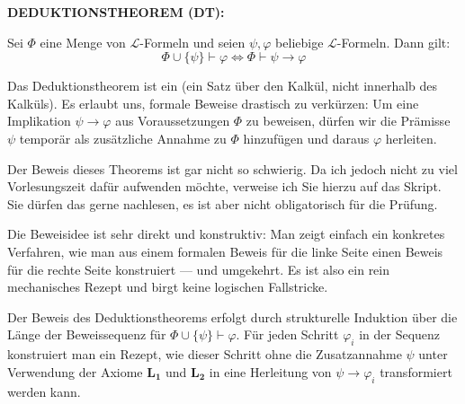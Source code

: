\begin{math-stroke}[DEDUKTIONSTHEOREM (DT)]
\textbf{DEDUKTIONSTHEOREM (DT):}

Sei $\Phi$ eine Menge von $\mathcal{L}$-Formeln und seien $\psi, \varphi$ beliebige $\mathcal{L}$-Formeln. Dann gilt:
\begin{equation}\label{eq:deduktionstheorem}
\Phi \cup \{\psi\} \vdash \varphi \iff \Phi \vdash \psi \rightarrow \varphi
\end{equation}

\begin{explanation-of-steps}
Das Deduktionstheorem ist ein  (ein Satz über den Kalkül, nicht innerhalb des Kalküls). Es erlaubt uns, formale Beweise drastisch zu verkürzen: Um eine Implikation $\psi \rightarrow \varphi$ aus Voraussetzungen $\Phi$ zu beweisen, dürfen wir die Prämisse $\psi$ temporär als zusätzliche Annahme zu $\Phi$ hinzufügen und daraus $\varphi$ herleiten.
\end{explanation-of-steps}
\end{math-stroke}

\begin{spoken-clean}[00:50:34 - 00:52:49]
Der Beweis dieses Theorems ist gar nicht so schwierig. Da ich jedoch nicht zu viel Vorlesungszeit dafür aufwenden möchte, verweise ich Sie hierzu auf das Skript. Sie dürfen das gerne nachlesen, es ist aber nicht obligatorisch für die Prüfung. 

Die Beweisidee ist sehr direkt und konstruktiv: Man zeigt einfach ein konkretes Verfahren, wie man aus einem formalen Beweis für die linke Seite einen Beweis für die rechte Seite konstruiert --- und umgekehrt. Es ist also ein rein mechanisches Rezept und birgt keine logischen Fallstricke.
\end{spoken-clean}

\begin{didactic-insight}
Der Beweis des Deduktionstheorems erfolgt durch strukturelle Induktion über die Länge der Beweissequenz für $\Phi \cup \{\psi\} \vdash \varphi$. Für jeden Schritt $\varphi_i$ in der Sequenz konstruiert man ein Rezept, wie dieser Schritt ohne die Zusatzannahme $\psi$ unter Verwendung der Axiome $\mathbf{L_1}$ und $\mathbf{L_2}$ in eine Herleitung von $\psi \rightarrow \varphi_i$ transformiert werden kann.
\end{didactic-insight}

